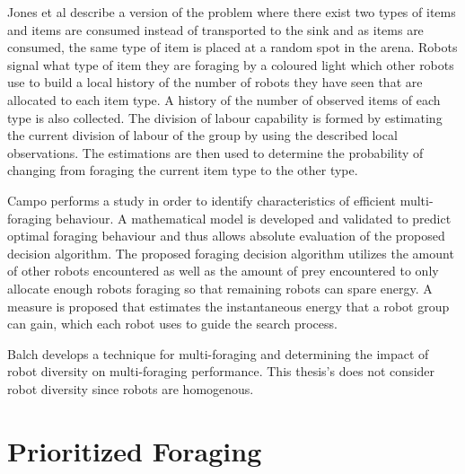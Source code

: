 Jones et al \cite{jones2003adaptive} describe a version of the problem where there exist two types of items and items are consumed instead of transported to the sink and as items are consumed, the same type of item is placed at a random spot in the arena. Robots signal what type of item they are foraging by a coloured light which other robots use to build a local history of the number of robots they have seen that are allocated to each item type. A history of the number of observed items of each type is also collected. The division of labour capability is formed by estimating the current division of labour of the group by  using the described local observations. The estimations are then used to determine the probability of changing from foraging the current item type to the other type. 


Campo \cite{campo2007efficient} performs a study in order to identify characteristics of efficient multi-foraging behaviour.  A mathematical model is developed and validated to predict optimal foraging behaviour and thus allows absolute evaluation of the proposed decision algorithm. The proposed foraging decision algorithm utilizes the amount of other robots encountered as well as the amount of prey encountered to only allocate enough robots foraging  so that remaining robots can spare energy. A measure is proposed that estimates the instantaneous energy that a robot group can gain, which each robot uses to guide the search process. 

Balch \cite{balch1999impact} develops a technique for multi-foraging and determining the impact of robot diversity on multi-foraging performance. This thesis's does not consider robot diversity since robots are homogenous.



\section{Prioritized Foraging}
\label{sec:second:prioritizedforaging}

